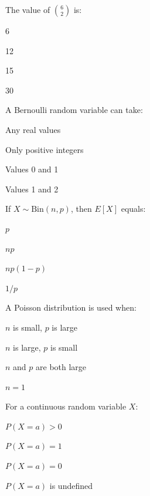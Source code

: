 \documentclass{USTBExam}
\begin{document}
\begin{question}
The value of $\binom{6}{2}$ is:
\paren
\begin{choices}
\item 6
\item 12
\item 15
\item 30
\end{choices}
\end{question}

\begin{question}
A Bernoulli random variable can take:
\paren
\begin{choices}
\item Any real values
\item Only positive integers
\item Values 0 and 1
\item Values 1 and 2
\end{choices}
\end{question}

\begin{question}
If $X\sim\mathrm{Bin}(n,p)$, then $E[X]$ equals:
\paren
\begin{choices}
\item $p$
\item $np$
\item $np(1-p)$
\item $1/p$
\end{choices}
\end{question}

\begin{question}
A Poisson distribution is used when:
\paren
\begin{choices}
\item $n$ is small, $p$ is large
\item $n$ is large, $p$ is small
\item $n$ and $p$ are both large
\item $n=1$
\end{choices}
\end{question}

\begin{question}
For a continuous random variable $X$:
\paren
\begin{choices}
\item $P(X=a)>0$
\item $P(X=a)=1$
\item $P(X=a)=0$
\item $P(X=a)$ is undefined
\end{choices}
\end{question}
\end{document}
